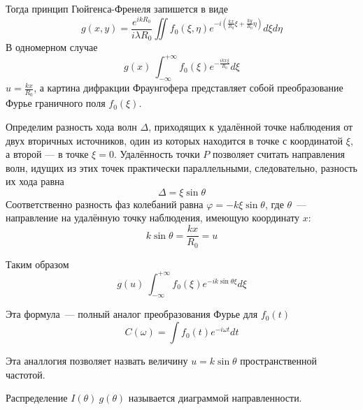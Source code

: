 Тогда принцип Гюйгенса-Френеля запишется в виде
\[
    g(x, y) = \frac{e^{ikR_{0}}}{i\lambda R_{0}}\iint f_{0}(\xi, \eta)e^{-i\left(\frac{kx}{R_{0}}\xi + \frac{ky}{R_{0}}\eta\right)} d\xi d\eta
\]
В одномерном случае
\[
    g(x) ~ \int_{-\infty}^{+\infty} f_{0}(\xi)e^{-\frac{ikx\xi}{R_{0}}}d\xi
\]
$u = \frac{kx}{R_{0}}$, а картина дифракции Фраунгофера представляет собой преобразование Фурье граничного поля $f_{0}(\xi)$. 

\begin{figure}[ht!]
\end{figure}

Определим разность хода волн $\Delta$,  приходящих к удалённой точке наблюдения от двух вторичных источников, один из которых находится в точке с координатой $\xi$, а второй — в точке $\xi = 0$. Удалённость точки $P$  позволяет считать направления волн, идущих из этих точек практически параллельными, следовательно, разность их хода равна
\[
    \Delta = \xi \sin \theta
\]
Соответственно разность фаз колебаний равна $ \varphi = -k\xi \sin \theta$, где $ \theta$~--- направление на удалённую точку наблюдения, имеющую координату $x$:
\[
    k\sin \theta = \frac{kx}{R_{0}} = u
\]

Таким образом
\[
    g(u) ~ \int_{-\infty}^{+\infty} f_{0}(\xi)e^{-ik\sin \theta \xi} d\xi
\]

Эта формула~--- полный аналог преобразования Фурье для $f_{0}(t)$
\[
    C(\omega) = \int f_{0}(t)e^{-i\omega t} dt
\]

Эта аналлогия позволяет назвать величину $u=k\sin \theta$ пространственной частотой.

Распределение $I(\theta) ~ g(\theta)$ называется диаграммой направленности.


